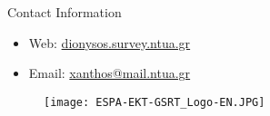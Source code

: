 \documentclass[final,a0,portrait]{beamer}
\newlength{\onecolwid}
\begin{document}
\begin{frame}[t]
\begin{columns}[t]
\begin{column}{\onecolwid}


\begin{alertblock}{Contact Information}
\begin{itemize}
\item Web: \href{http://dionysos.survey.ntua.gr}{dionysos.survey.ntua.gr}
\item Email: \href{xanthos@mail.ntua.gr}{xanthos@mail.ntua.gr}
\end{itemize}
\end{alertblock}

\begin{figure}
\texttt{[image: ESPA-EKT-GSRT\_Logo-EN.JPG]}
\end{figure}


\end{column} %

\end{columns} %

\end{frame} %
\end{document}
